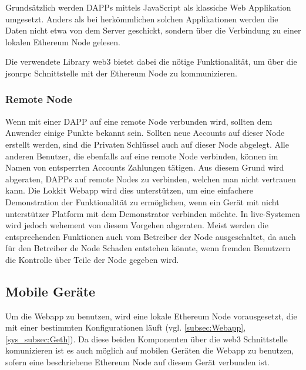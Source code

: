 Grundsätzlich werden \acrshort{DAPPs} mittels JavaScript als klassiche Web Applikation umgesetzt. Anders als bei herkömmlichen solchen Applikationen werden die Daten nicht etwa von dem Server geschickt, sondern über die Verbindung zu einer lokalen Ethereum Node gelesen.\cite[Wiki/DAPP-Developer-Resources, Wiki/Useful-Dapp-Patterns]{github.com/ethereum}

Die verwendete Library web3 bietet dabei die nötige Funktionalität, um über die jsonrpc Schnittstelle mit der Ethereum Node zu kommunizieren.\cite{github.com/ethereum/web3js}


\subsubsection{Remote Node}
\label{subsubsec:Remote_Node}
Wenn mit einer \acrshort{DAPP} auf eine remote Node verbunden wird, sollten dem Anwender einige Punkte bekannt sein. Sollten neue Accounts auf dieser Node erstellt werden, sind die Privaten Schlüssel auch auf dieser Node abgelegt. Alle anderen Benutzer, die ebenfalls auf eine remote Node verbinden, können im Namen von entsperrten Accounts Zahlungen tätigen. Aus diesem Grund wird abgeraten, \acrshort{DAPPs} auf remote Nodes zu verbinden, welchen man nicht vertrauen kann. Die Lokkit Webapp wird dies unterstützen, um eine einfachere Demonstration der Funktionalität zu ermöglichen, wenn ein Gerät mit nicht unterstützer Platform mit dem Demonstrator verbinden möchte. In live-Systemen wird jedoch wehement von diesem Vorgehen abgeraten. Meist werden die entsprechenden Funktionen auch vom Betreiber der Node ausgeschaltet, da auch für den Betreiber de Node Schaden entstehen könnte, wenn fremden Benutzern die Kontrolle über Teile der Node gegeben wird.\cite[Wiki/DAPP-Developer-Resources, Wiki/Useful-Dapp-Patterns]{github.com/ethereum}

\subsection{Mobile Geräte}
Um die Webapp zu benutzen, wird eine lokale Ethereum Node vorausgesetzt, die mit einer bestimmten Konfigurationen läuft (vgl. \ref{subsec:Webapp}, \ref{sys_subsec:Geth}). Da diese beiden Komponenten über die web3 Schnittstelle komunizieren ist es auch möglich auf mobilen Geräten die Webapp zu benutzen, sofern eine beschriebene Ethereum Node auf diesem Gerät verbunden ist.

